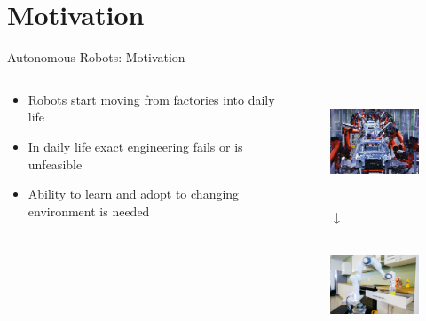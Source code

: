 \documentclass[navbarinfooter, 12pt]{sdqbeamer}
\begin{document}
\section{Motivation}
\begin{frame}{Autonomous Robots: Motivation}
  \begin{columns}[c]
    \begin{column}{8cm}
      \begin{itemize}
      \item Robots start moving from factories into daily life
      \item In daily life exact engineering fails or is unfeasible
      \item Ability to learn and adopt to changing environment is needed
      \end{itemize}
    \end{column}
    \begin{column}{5cm}
      \begin{figure}[ht]
        \centering
        \includegraphics[height=3cm]{figures/factory_robot.png}

        $\downarrow$

        \vspace{0.3cm}
        \includegraphics[height=2.8cm]{figures/kitchen_robot.jpg}
      \end{figure}
    \end{column}
  \end{columns}
\end{frame}
\end{document}
